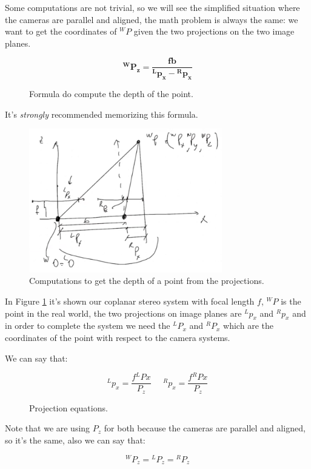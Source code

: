Some computations are not trivial, so we will see the simplified situation where the cameras are parallel and aligned, the math problem is always the same: we want to get the coordinates of \({}^WP\) given the two projections on the two image planes.

\begin{figure}[H]
\[
        \bm{{}^WP_z = \frac{fb}{{}^Lp_x-{}^Rp_x}}
\]
\caption{Formula do compute the depth of the point.}
\end{figure}

It's \textit{strongly} recommended memorizing this formula.

\begin{figure}[H]
    \centering
    \includegraphics[width=0.75\textwidth]{Figures/epi_comp.png}
    \caption{Computations to get the depth of a point from the projections.}
    \label{fig:epi_comp}
\end{figure}

In Figure \ref{fig:epi_comp} it's shown our coplanar stereo system with focal length \(f\), \({}^WP\) is the point in the real world, the two projections on image planes are \({}^Lp_x\) and \({}^Rp_x\) and in order to complete the system we need the \({}^LP_x\) and \({}^RP_x\) which are the coordinates of the point with respect to the camera systems. 

We can say that: 

\begin{figure}[H]    
\[
    {}^Lp_x = \frac{f{}^LPx}{P_z}\;\;\;\;\;   
    {}^Rp_x = \frac{f{}^RPx}{P_z}  
\]
\caption{Projection equations.}
\label{eq:proj}
\end{figure}
Note that we are using \(P_z\) for both because the cameras are parallel and aligned, so it's the same, also we can say that:

\[
    {}^WP_z = {}^LP_z = {}^RP_z
\]

